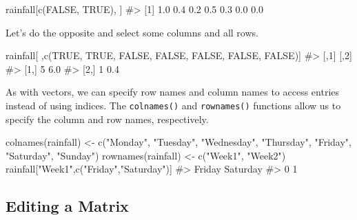 \documentclass[
  letterpaper,
]{krantz}
\makeatletter
\newenvironment{Shaded}{\begin{snugshade}}{\end{snugshade}}
\newcommand{\CommentTok}[1]{\textcolor[rgb]{0.37,0.37,0.37}{#1}}
\newcommand{\ConstantTok}[1]{\textcolor[rgb]{0.56,0.35,0.01}{#1}}
\newcommand{\FunctionTok}[1]{\textcolor[rgb]{0.28,0.35,0.67}{#1}}
\newcommand{\NormalTok}[1]{\textcolor[rgb]{0.00,0.23,0.31}{#1}}
\newcommand{\OtherTok}[1]{\textcolor[rgb]{0.00,0.23,0.31}{#1}}
\newcommand{\StringTok}[1]{\textcolor[rgb]{0.13,0.47,0.30}{#1}}
\newenvironment{kframe}{%
\medskip{}
\setlength{\fboxsep}{.8em}
 \def\at@end@of@kframe{}%
 \ifinner\ifhmode%
  \def\at@end@of@kframe{\end{minipage}}%
  \begin{minipage}{\columnwidth}%
 \fi\fi%
 \def\FrameCommand##1{\hskip\@totalleftmargin \hskip-\fboxsep
 \colorbox{shadecolor}{##1}\hskip-\fboxsep
     \hskip-\linewidth \hskip-\@totalleftmargin \hskip\columnwidth}%
 \MakeFramed {\advance\hsize-\width
   \@totalleftmargin\z@ \linewidth\hsize
   \@setminipage}}%
 {\par\unskip\endMakeFramed%
 \at@end@of@kframe}
\renewenvironment{Shaded}{\begin{kframe}}{\end{kframe}}
\makeatother
\begin{document}
\begin{Shaded}
\begin{Highlighting}[]
\NormalTok{rainfall[}\FunctionTok{c}\NormalTok{(}\ConstantTok{FALSE}\NormalTok{, }\ConstantTok{TRUE}\NormalTok{), ]}
\CommentTok{\#\textgreater{} [1] 1.0 0.4 0.2 0.5 0.3 0.0 0.0}
\end{Highlighting}
\end{Shaded}

Let's do the opposite and select some columns and all rows.

\begin{Shaded}
\begin{Highlighting}[]
\NormalTok{rainfall[ ,}\FunctionTok{c}\NormalTok{(}\ConstantTok{TRUE}\NormalTok{, }\ConstantTok{TRUE}\NormalTok{, }\ConstantTok{FALSE}\NormalTok{, }\ConstantTok{FALSE}\NormalTok{, }\ConstantTok{FALSE}\NormalTok{, }\ConstantTok{FALSE}\NormalTok{, }\ConstantTok{FALSE}\NormalTok{)]}
\CommentTok{\#\textgreater{}      [,1] [,2]}
\CommentTok{\#\textgreater{} [1,]    5  6.0}
\CommentTok{\#\textgreater{} [2,]    1  0.4}
\end{Highlighting}
\end{Shaded}

As with vectors, we can specify row names and column names to access
entries instead of using indices. The \texttt{colnames()} and
\texttt{rownames()} functions allow us to specify the column and row
names, respectively.

\begin{Shaded}
\begin{Highlighting}[]
\FunctionTok{colnames}\NormalTok{(rainfall) }\OtherTok{\textless{}{-}} \FunctionTok{c}\NormalTok{(}\StringTok{"Monday"}\NormalTok{, }\StringTok{"Tuesday"}\NormalTok{, }\StringTok{"Wednesday"}\NormalTok{, }\StringTok{"Thursday"}\NormalTok{, }
                        \StringTok{"Friday"}\NormalTok{, }\StringTok{"Saturday"}\NormalTok{, }\StringTok{"Sunday"}\NormalTok{)}
\FunctionTok{rownames}\NormalTok{(rainfall) }\OtherTok{\textless{}{-}} \FunctionTok{c}\NormalTok{(}\StringTok{"Week1"}\NormalTok{, }\StringTok{"Week2"}\NormalTok{)}
\NormalTok{rainfall[}\StringTok{"Week1"}\NormalTok{,}\FunctionTok{c}\NormalTok{(}\StringTok{"Friday"}\NormalTok{,}\StringTok{"Saturday"}\NormalTok{)]}
\CommentTok{\#\textgreater{}   Friday Saturday }
\CommentTok{\#\textgreater{}        0        1}
\end{Highlighting}
\end{Shaded}

\subsection{Editing a Matrix}\label{editing-a-matrix}
\end{document}
